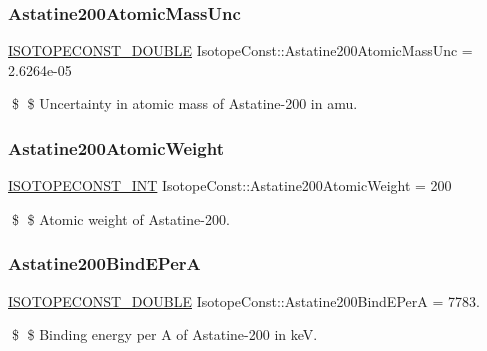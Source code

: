 \subsubsection{\texorpdfstring{Astatine200\+Atomic\+Mass\+Unc}{Astatine200AtomicMassUnc}}
{\footnotesize\ttfamily \mbox{\hyperlink{group___isotope_const-_macros_ga8f45a7272ce02c0b4c65c44636ed719a}{I\+S\+O\+T\+O\+P\+E\+C\+O\+N\+S\+T\+\_\+\+D\+O\+U\+B\+LE}} Isotope\+Const\+::\+Astatine200\+Atomic\+Mass\+Unc = 2.\+6264e-\/05}

\$ \$ Uncertainty in atomic mass of Astatine-\/200 in amu. \mbox{\label{group___isotope_const-_astatine-_at200_ga77fa331627c86dab95a2f221e4392bde}} 
\subsubsection{\texorpdfstring{Astatine200\+Atomic\+Weight}{Astatine200AtomicWeight}}
{\footnotesize\ttfamily \mbox{\hyperlink{group___isotope_const-_macros_ga5f18360b3e99483a35c32d789e62621c}{I\+S\+O\+T\+O\+P\+E\+C\+O\+N\+S\+T\+\_\+\+I\+NT}} Isotope\+Const\+::\+Astatine200\+Atomic\+Weight = 200}

\$ \$ Atomic weight of Astatine-\/200. \mbox{\label{group___isotope_const-_astatine-_at200_gad28e6f92a1a9858a0065d0b9dd27ff86}} 
\subsubsection{\texorpdfstring{Astatine200\+Bind\+E\+PerA}{Astatine200BindEPerA}}
{\footnotesize\ttfamily \mbox{\hyperlink{group___isotope_const-_macros_ga8f45a7272ce02c0b4c65c44636ed719a}{I\+S\+O\+T\+O\+P\+E\+C\+O\+N\+S\+T\+\_\+\+D\+O\+U\+B\+LE}} Isotope\+Const\+::\+Astatine200\+Bind\+E\+PerA = 7783.}

\$ \$ Binding energy per A of Astatine-\/200 in keV. \mbox{\label{group___isotope_const-_astatine-_at200_gae38544061a68a91b11e73d200dad4627}} 
